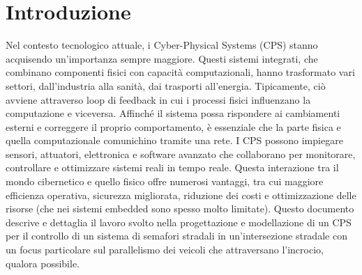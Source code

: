 \chapter*{Introduzione}
\label{cap:introduzione}

\rhead{\thepage}

Nel contesto tecnologico attuale, i Cyber-Physical Systems (CPS) stanno 
acquisendo un'importanza sempre maggiore. Questi sistemi integrati, che 
combinano componenti fisici con capacità computazionali, hanno trasformato 
vari settori, dall'industria alla sanità, dai trasporti all'energia. 
Tipicamente, ciò avviene attraverso loop di feedback in cui i processi 
fisici influenzano la computazione e viceversa. Affinché il sistema possa 
rispondere ai cambiamenti esterni e correggere il proprio comportamento, 
è essenziale che la parte fisica e quella computazionale comunichino 
tramite una rete. I CPS possono impiegare sensori, attuatori, elettronica 
e software avanzato che collaborano per monitorare, controllare e 
ottimizzare sistemi reali in tempo reale. Questa interazione tra il 
mondo cibernetico e quello fisico offre numerosi vantaggi, tra cui maggiore 
efficienza operativa, sicurezza migliorata, riduzione dei costi e 
ottimizzazione delle risorse (che nei sistemi embedded sono spesso molto 
limitate). Questo documento descrive e dettaglia il lavoro svolto nella 
progettazione e modellazione di un CPS per il controllo di un sistema 
di semafori stradali in un'intersezione stradale con un focus particolare
sul parallelismo dei veicoli che attraversano l'incrocio, qualora possibile.